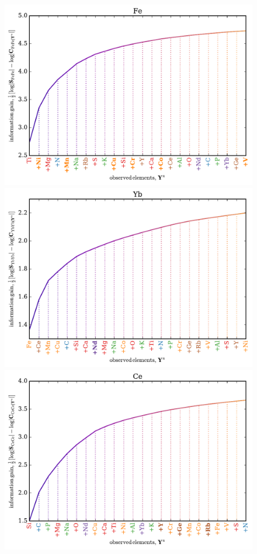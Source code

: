 \documentclass[a4paper,fleqn,usenatbib]{mnras}
\begin{document}
\begin{figure}
	\includegraphics[width=\columnwidth]{apogee_centers_final_29502_spc_iw_prior_win_wid_1p5_fe_inf_gain.pdf}
	\includegraphics[width=\columnwidth]{apogee_centers_final_29502_spc_iw_prior_win_wid_1p5_yb_inf_gain.pdf}
	\includegraphics[width=\columnwidth]{apogee_centers_final_29502_spc_iw_prior_win_wid_1p5_ce_inf_gain.pdf}

\end{figure}
\end{document}
